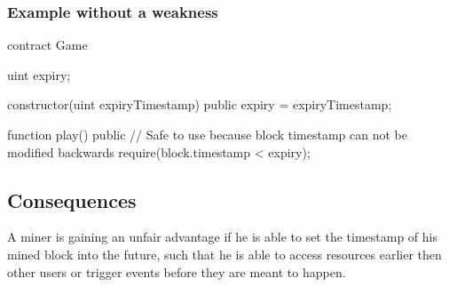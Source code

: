\subsubsection{Example without a weakness}
\begin{solidity}
contract Game {
    uint expiry;

    constructor(uint expiryTimestamp) public {
        expiry = expiryTimestamp;
    }

    function play() public {
        // Safe to use because block timestamp can not be modified backwards
        require(block.timestamp < expiry);
    }
}
\end{solidity}
    
\subsection{Consequences}
A miner is gaining an unfair advantage if he is able to set the timestamp
of his mined block into the future, such that he is able to access
resources earlier then other users or trigger events before they are meant to happen.
